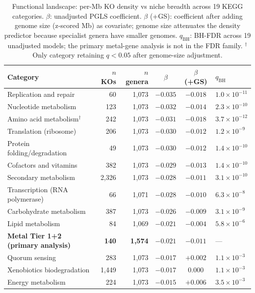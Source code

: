 \documentclass[times]{zHenriquesLab-StyleBioRxiv}
\begin{document}
\begin{table}[htbp]
\caption{Functional landscape: per-Mb KO density vs niche breadth across 19
KEGG categories. $\beta$: unadjusted PGLS coefficient. $\beta$ (+GS): coefficient
after adding genome size (z-scored Mb) as covariate; genome size attenuates the
density predictor because specialist genera have smaller genomes. $q_{\mathrm{BH}}$:
BH-FDR across 19 unadjusted models; the primary metal-gene analysis is not in the FDR family.
$^\dagger$Only category retaining $q < 0.05$ after genome-size adjustment.}
\label{tab:3}
\centering
\small
\begin{tabular}{lrrccl}
\toprule
Category & $n$ KOs & $n$ genera & $\beta$ & $\beta$ (+GS) & $q_{\mathrm{BH}}$ \\
\midrule
Replication and repair & 60 & 1,073 & $\mathbf{-0.035}$ & $-0.018$ & $1.0 \times 10^{-11}$ \\
Nucleotide metabolism & 123 & 1,073 & $\mathbf{-0.032}$ & $-0.014$ & $2.3 \times 10^{-10}$ \\
Amino acid metabolism$^\dagger$ & 242 & 1,073 & $\mathbf{-0.031}$ & $\mathbf{-0.018}$ & $3.7 \times 10^{-12}$ \\
Translation (ribosome) & 206 & 1,073 & $\mathbf{-0.030}$ & $-0.012$ & $1.2 \times 10^{-9}$ \\
Protein folding/degradation & 49 & 1,073 & $\mathbf{-0.030}$ & $-0.012$ & $1.4 \times 10^{-10}$ \\
Cofactors and vitamins & 382 & 1,073 & $\mathbf{-0.029}$ & $-0.013$ & $1.4 \times 10^{-10}$ \\
Secondary metabolism & 2,326 & 1,073 & $\mathbf{-0.028}$ & $-0.011$ & $3.1 \times 10^{-10}$ \\
Transcription (RNA polymerase) & 66 & 1,071 & $\mathbf{-0.028}$ & $-0.010$ & $6.3 \times 10^{-8}$ \\
Carbohydrate metabolism & 387 & 1,073 & $\mathbf{-0.026}$ & $-0.009$ & $3.1 \times 10^{-9}$ \\
Lipid metabolism & 84 & 1,069 & $\mathbf{-0.021}$ & $-0.004$ & $5.8 \times 10^{-6}$ \\
\textbf{Metal Tier 1+2 (primary analysis)} & \textbf{140} & \textbf{1,574}
  & $\mathbf{-0.021}$ & $\mathbf{-0.011}$ & --- \\
Quorum sensing & 283 & 1,073 & $-0.017$ & $+0.002$ & $1.1 \times 10^{-3}$ \\
Xenobiotics biodegradation & 1,449 & 1,073 & $-0.017$ & $0.000$ & $1.1 \times 10^{-3}$ \\
Energy metabolism & 224 & 1,073 & $-0.015$ & $+0.006$ & $3.5 \times 10^{-3}$ \\

\end{tabular}
\end{table}
\end{document}
